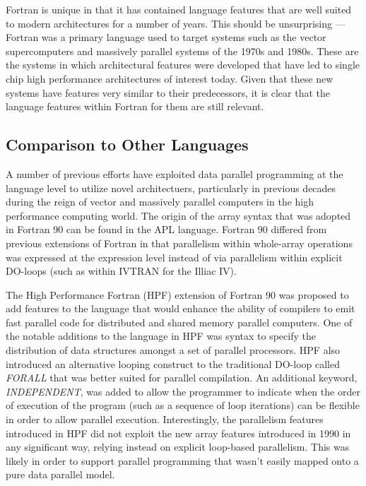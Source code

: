 Fortran is unique in that it has contained language features that are
well suited to modern architectures for a number of years.  This
should be unsurprising --- Fortran was a primary language used to
target systems such as the vector supercomputers and massively
parallel systems of the 1970s and 1980s.  These are the systems in
which architectural features were developed that have led to single
chip high performance architectures of interest today.  Given that
these new systems have features very similar to their predecessors, it
is clear that the language features within Fortran for them are still
relevant.

\subsection{Comparison to Other Languages}

A number of previous efforts have exploited data parallel programming
at the language level to utilize novel architectuers, particularly
in previous decades during the reign of vector and massively
parallel computers in the high performance computing world.  The
origin of the array syntax that was adopted in Fortran 90 can be found
in the APL language\cite{iverson79apl}.  Fortran 90 differed from
previous extensions of Fortran in that parallelism within whole-array operations
was expressed at the expression level instead of via parallelism within explicit
DO-loops (such as within IVTRAN for the Illiac IV). 

The High Performance Fortran (HPF) extension of Fortran 90 was
proposed to add features to the language that would enhance the
ability of compilers to emit fast parallel code for distributed and
shared memory parallel computers\cite{koelbel94hpf}.  One of the
notable additions to the language in HPF was syntax to specify the
distribution of data structures amongst a set of parallel processors.
HPF also introduced an alternative looping construct to the
traditional DO-loop called \emph{FORALL} that was better suited for
parallel compilation.  An additional keyword, \emph{INDEPENDENT}, was
added to allow the programmer to indicate when the order of execution
of the program (such as a sequence of loop iterations) can be flexible
in order to allow parallel execution.  Interestingly, the parallelism
features introduced in HPF did not exploit the new array features
introduced in 1990 in any significant way, relying instead on explicit
loop-based parallelism.  This was likely in order to support parallel
programming that wasn't easily mapped onto a pure data parallel model.

